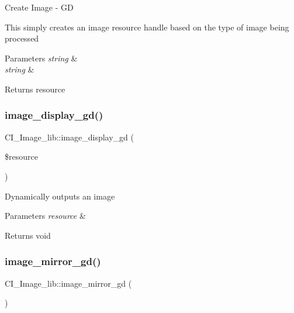 Create Image -\/ GD

This simply creates an image resource handle based on the type of image being processed


\begin{DoxyParams}{Parameters}
{\em string} & \\
\hline
{\em string} & \\
\hline
\end{DoxyParams}
\begin{DoxyReturn}{Returns}
resource 
\end{DoxyReturn}
\mbox{\label{class_c_i___image__lib_a9aee68883462f0190074ad07562d8c38}} 
\subsubsection{\texorpdfstring{image\+\_\+display\+\_\+gd()}{image\_display\_gd()}}
{\footnotesize\ttfamily C\+I\+\_\+\+Image\+\_\+lib\+::image\+\_\+display\+\_\+gd (\begin{DoxyParamCaption}\item[{}]{\$resource }\end{DoxyParamCaption})}

Dynamically outputs an image


\begin{DoxyParams}{Parameters}
{\em resource} & \\
\hline
\end{DoxyParams}
\begin{DoxyReturn}{Returns}
void 
\end{DoxyReturn}
\mbox{\label{class_c_i___image__lib_ab94820fee552a92599bc54b1b9bcd57e}} 
\subsubsection{\texorpdfstring{image\+\_\+mirror\+\_\+gd()}{image\_mirror\_gd()}}
{\footnotesize\ttfamily C\+I\+\_\+\+Image\+\_\+lib\+::image\+\_\+mirror\+\_\+gd (\begin{DoxyParamCaption}{ }\end{DoxyParamCaption})}

